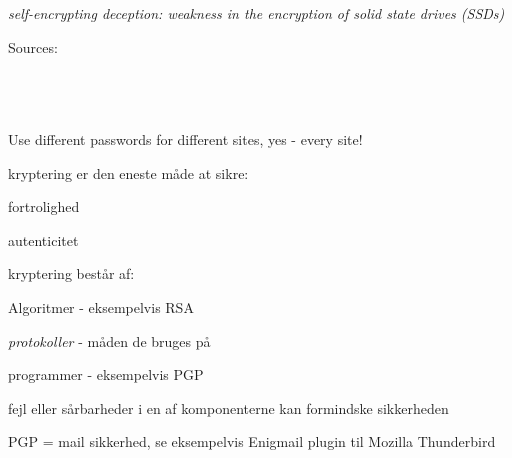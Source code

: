 \documentclass[Screen16to9,17pt]{foils}
\begin{document}

\emph{self-encrypting deception: weakness in the encryption of solid state drives (SSDs)}\\







 Sources:\\
{\footnotesize{}\\
\\
\\
}

\vskip 5mm
\centerline{Use different passwords for different sites, yes - every site!}




\begin{list1}
  \item kryptering er den eneste måde at sikre:
    \begin{list2}
      \item fortrolighed
      \item autenticitet
    \end{list2}
\item kryptering består af:
  \begin{list2}
    \item Algoritmer - eksempelvis RSA
    \item \emph{protokoller} - måden de bruges på
\item programmer - eksempelvis PGP
\end{list2}
\item fejl eller sårbarheder i en af komponenterne kan formindske
  sikkerheden
\item PGP = mail sikkerhed, se eksempelvis Enigmail plugin til Mozilla Thunderbird

\end{list1}

\end{document}
